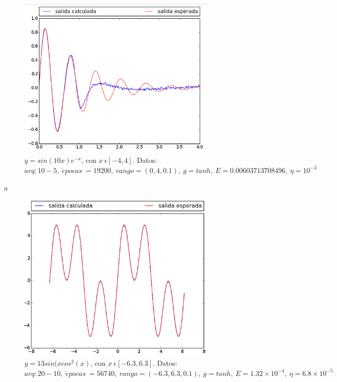 \documentclass[12pt,a4paper]{article}
\begin{document}
\begin{figure}[H]
\centering
\includegraphics[width=0.85\textwidth]{img/ecuacion1.png}
\caption{\label{fig:ecuacion1} $y = sin(10x)e^{-x}\text{, con }  x \ \epsilon [-4,4]$. Datos: $arq: 10-5,\ \acute{e} pocas \ = 19200,\ rango=(0, 4, 0.1),\ g=tanh, \ E = 0.00603713708496,\ \eta = 10^{-3}$}
\end{figure}a

\begin{figure}[H]
\centering
\includegraphics[width=0.85\textwidth]{img/ecuacion2.png}
\caption{\label{fig:ecuacion2} $y = 13sin(xcos^{2}(x)\text{, con }  x \ \epsilon [-6.3,6.3]$. Datos: $arq: 20-10,\ \acute{e} pocas \ = 56740,\ rango=(-6.3, 6.3, 0.1),\ g=tanh, \ E = 1.32 \times 10^{-4},\ \eta = 6.8\times 10^{-5}$}
\end{figure}
\end{document}
